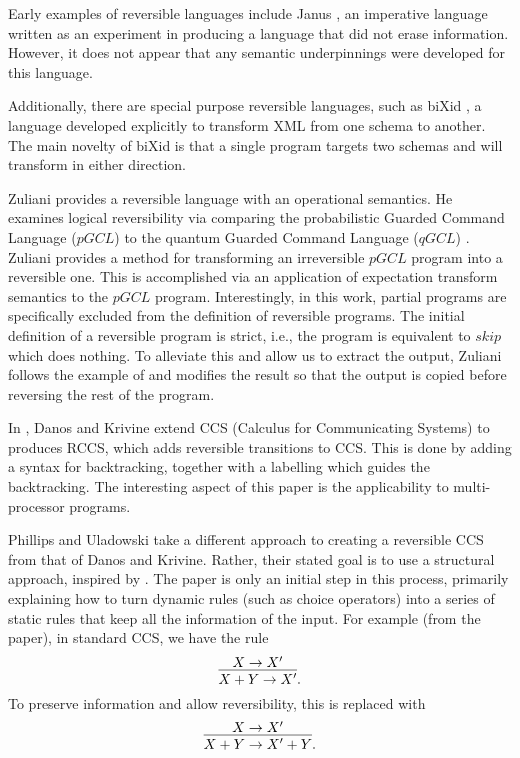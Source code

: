 Early examples of reversible languages include Janus \cite{lutz1986janus}, an imperative language
written as an experiment in producing a language that did not erase information. However, it does
not appear that any semantic underpinnings were developed for this language.

Additionally, there are special purpose reversible languages, such as biXid \cite{bixid06}, a
language developed explicitly to transform XML \cite{xml} from one schema to another. The main
novelty of biXid is that a single program targets two schemas and will transform in either direction.

Zuliani \cite{zuliani01:reversibility} provides a reversible language with an operational
semantics. He examines logical reversibility via comparing the probabilistic Guarded Command
Language ($pGCL$) \cite{MorganIver99} to the quantum Guarded Command Language ($qGCL$)
\cite{sanders:quantum}. Zuliani provides a method for transforming an irreversible $pGCL$ program
into a reversible one. This is accomplished via an application of expectation transform semantics to
the $pGCL$ program. Interestingly, in this work, partial programs are specifically excluded from the
definition of reversible programs. The initial definition of a reversible program is strict, i.e.,
the program is equivalent to $skip$ which does nothing. To alleviate this and allow us to extract
the output, Zuliani follows the example of \cite{bennett:1973reverse} and modifies the result so
that the output is copied before reversing the rest of the program.

In \cite{danos2004reversible}, Danos and Krivine extend CCS (Calculus for Communicating Systems)
\cite{milner1980calculus,milner1989communication} to produces RCCS, which adds reversible
transitions to CCS. This is done by adding a syntax for backtracking, together with a labelling
which guides the backtracking. The interesting aspect of this paper is the applicability to
multi-processor programs.

Phillips and Uladowski \cite{phillips2006operational} take a different approach to creating a
reversible CCS from that of Danos and Krivine. Rather, their stated goal is to use a structural
approach, inspired by \cite{abramsky05:reversible}. The paper is only an initial step in this
process, primarily explaining how to turn dynamic rules (such as choice operators) into a series of
static rules that keep all the information of the input. For example (from the paper), in standard
CCS, we have the rule
\[
  \infer{X+Y \to X'}{X\to X'}.
\]
To preserve information and allow reversibility, this is replaced with
\[
  \infer{X+Y \to X' +Y}{X\to X'}.
\]

